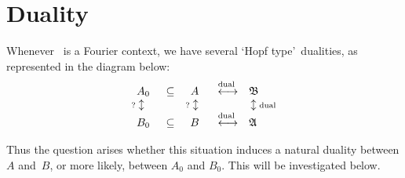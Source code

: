 
\section{Duality}



\begin{abs_chp}
Whenever \FourierBABA\ is a Fourier context, we have several \lq Hopf type\rq\ dualities,
as represented in the diagram below:
{\normalsize
$$ \begin{array}{ccccl}
A_0 & \subseteq & A & \stackrel{\rm dual}{\vertS \longleftrightarrow} & {\frakB} \\
 {\scriptstyle ?} \updownarrow\hspace{1em} &  &  {\scriptstyle ?}\updownarrow\;\:
           & & \,\updownarrow {\scriptstyle \rm dual}      \\
B_0 & \subseteq & B &  \stackrel{\rm dual}{\vertS \longleftrightarrow} & {\frakA}
\end{array}$$}

Thus the question arises whether this situation induces a natural
duality between $A$ \mbox{and $B$}, or more likely, between $A_0$ and $B_0$.
This will be investigated below.
\end{abs_chp}




